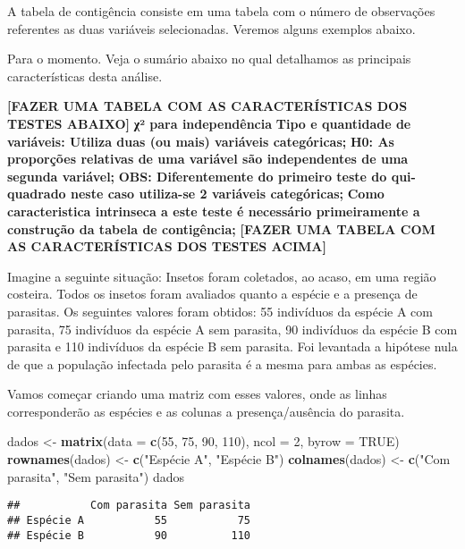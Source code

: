 \documentclass[]{book}
\newenvironment{Shaded}{\begin{snugshade}}{\end{snugshade}}
\newcommand{\DataTypeTok}[1]{\textcolor[rgb]{0.13,0.29,0.53}{#1}}
\newcommand{\DecValTok}[1]{\textcolor[rgb]{0.00,0.00,0.81}{#1}}
\newcommand{\KeywordTok}[1]{\textcolor[rgb]{0.13,0.29,0.53}{\textbf{#1}}}
\newcommand{\NormalTok}[1]{#1}
\newcommand{\OtherTok}[1]{\textcolor[rgb]{0.56,0.35,0.01}{#1}}
\newcommand{\StringTok}[1]{\textcolor[rgb]{0.31,0.60,0.02}{#1}}
\begin{document}
A tabela de contigência consiste em uma tabela com o número de observações referentes as duas variáveis selecionadas. Veremos alguns exemplos abaixo.

Para o momento. Veja o sumário abaixo no qual detalhamos as principais características desta análise.

\textbf{{[}FAZER UMA TABELA COM AS CARACTERÍSTICAS DOS TESTES ABAIXO{]}}
\textbf{χ² para independência}
\textbf{Tipo e quantidade de variáveis: Utiliza duas (ou mais) variáveis categóricas;}
\textbf{H0: As proporções relativas de uma variável são independentes de uma segunda variável;}
\textbf{OBS: Diferentemente do primeiro teste do qui-quadrado neste caso utiliza-se 2 variáveis categóricas;}
\textbf{Como caracteristica intrinseca a este teste é necessário primeiramente a construção da tabela de contigência;}
\textbf{{[}FAZER UMA TABELA COM AS CARACTERÍSTICAS DOS TESTES ACIMA{]}}

Imagine a seguinte situação: Insetos foram coletados, ao acaso, em uma região costeira. Todos os insetos foram avaliados quanto a espécie e a presença de parasitas. Os seguintes valores foram obtidos: 55 indivíduos da espécie A com parasita, 75 indivíduos da espécie A sem parasita, 90 indivíduos da espécie B com parasita e 110 indivíduos da espécie B sem parasita. Foi levantada a hipótese nula de que a população infectada pelo parasita é a mesma para ambas as espécies.

Vamos começar criando uma matriz com esses valores, onde as linhas corresponderão as espécies e as colunas a presença/ausência do parasita.

\begin{Shaded}
\begin{Highlighting}[]
\NormalTok{dados <-}\StringTok{ }\KeywordTok{matrix}\NormalTok{(}\DataTypeTok{data =} \KeywordTok{c}\NormalTok{(}\DecValTok{55}\NormalTok{, }\DecValTok{75}\NormalTok{, }\DecValTok{90}\NormalTok{, }\DecValTok{110}\NormalTok{), }\DataTypeTok{ncol =} \DecValTok{2}\NormalTok{, }\DataTypeTok{byrow =} \OtherTok{TRUE}\NormalTok{)}
\KeywordTok{rownames}\NormalTok{(dados) <-}\StringTok{ }\KeywordTok{c}\NormalTok{(}\StringTok{"Espécie A"}\NormalTok{, }\StringTok{"Espécie B"}\NormalTok{)}
\KeywordTok{colnames}\NormalTok{(dados) <-}\StringTok{ }\KeywordTok{c}\NormalTok{(}\StringTok{"Com parasita"}\NormalTok{, }\StringTok{"Sem parasita"}\NormalTok{)}
\NormalTok{dados}
\end{Highlighting}
\end{Shaded}

\begin{verbatim}
##           Com parasita Sem parasita
## Espécie A           55           75
## Espécie B           90          110
\end{verbatim}
\end{document}
